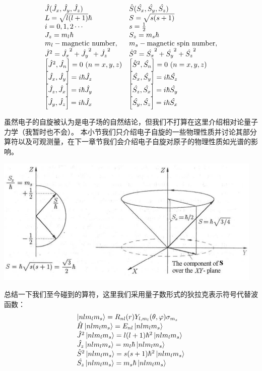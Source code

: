 \[
    \begin{array}{ll}
        \hat{J}(\hat{J_x},\hat{J_y},\hat{J_z}) & \hat{S}(\hat{S_x},\hat{S_y},\hat{S_z}) \\
        L=\sqrt{l(l+1)}\hbar & S=\sqrt{s(s+1)}\\
        i=0,1,2 \cdots & s=\frac{1}{2}\\
        J_z=m_l\hbar & S_z=m_s\hbar\\
        m_l - \text{magnetic number}, & m_s - \text{magnetic spin number},\\
        \hat{J}^2=\hat{J_x}^2+\hat{J_y}^2+\hat{J_z}^2 & \hat{S}^2=\hat{S_x}^2+\hat{S_y}^2+\hat{S_z}^2 \\
        \qty[\hat{J}^2,\hat{J_n}]=0 \ (n=x,y,z) & \qty[\hat{S}^2,\hat{S_n}]=0 \ (n=x,y,z)\\
        \qty[\hat{J_x},\hat{J_y}]=i\hbar\hat{J_z} & \qty[\hat{S_x},\hat{S_y}]=i\hbar\hat{S_z}\\
        \qty[\hat{J_z},\hat{J_x}]=i\hbar\hat{J_y} & \qty[\hat{S_z},\hat{S_x}]=i\hbar\hat{S_y}\\
        \qty[\hat{J_y},\hat{J_z}]=i\hbar\hat{J_x} & \qty[\hat{S_y},\hat{S_z}]=i\hbar\hat{S_x}
    \end{array}
\]

虽然电子的自旋被认为是电子场的自然结论，但我们不打算在这里介绍相对论量子力学（我暂时也不会）。
本小节我们只介绍电子自旋的一些物理性质并讨论其部分算符以及可观测量，在下一章节我们会介绍电子自旋对原子的物理性质如光谱的影响。

\begin{center}
    \includegraphics[scale=0.7]{fig/lzhx/微信图片_20211028113518}
\end{center}

总结一下我们至今碰到的算符，这里我们采用量子数形式的狄拉克表示符号代替波函数：
\[
    \begin{array}{ll}
        \ket{nlm_lm_s}=R_{nl}(r)Y_{l,m_l}(\theta,\varphi)\sigma_{m_s} \\
        \hat{H}\ket{nlm_lm_s}=E_{nl}\ket{nlm_lm_s} \\
        \hat{J}^2\ket{nlm_lm_s}=l(l+1)\hbar^2\ket{nlm_lm_s} \\
        \hat{J_z}\ket{nlm_lm_s}=m_l\hbar\ket{nlm_lm_s} \\
        \hat{S}^2\ket{nlm_lm_s}=s(s+1)\hbar^2\ket{nlm_lm_s} \\
        \hat{S_z}\ket{nlm_lm_s}=m_s\hbar\ket{nlm_lm_s}
    \end{array}
\]

